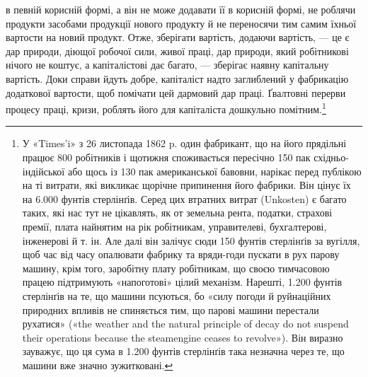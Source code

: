 в певній корисній формі, а він не може додавати її в корисній
формі, не роблячи продукти засобами продукції нового продукту
й не переносячи тим самим їхньої вартости на новий продукт.
Отже, зберігати вартість, додаючи вартість, — це є дар природи,
діющої робочої сили, живої праці, дар природи, який робітникові
нічого не коштує, а капіталістові дає багато, — зберігає наявну
капітальну вартість.  Доки справи йдуть добре, капіталіст
надто заглиблений у фабрикацію додаткової вартости, щоб помічати
цей дармовий дар праці. Ґвалтовні перерви процесу праці,
кризи, роблять його для капіталіста дошкульно помітним.\footnote{
У «Times’i» з 26 листопада 1862 p. один фабрикант, що на його
прядільні працює 800 робітників і щотижня споживається пересічно 150 пак
східньо-індійської або щось із 130 пак американської бавовни, нарікає
перед публікою на ті витрати, які викликає щорічне припинення його
фабрики. Він цінує їх на 6.000 фунтів стерлінґів. Серед цих втратних
витрат (Unkosten) є багато таких, які нас тут не цікавлять, як от земельна
рента, податки, страхові премії, плата найнятим на рік робітникам, управителеві,
бухгалтерові, інженерові й т. ін. Але далі він залічує сюди
150 фунтів стерлінґів за вугілля, щоб час від часу опалювати фабрику та
вряди-годи пускати в рух парову машину, крім того, заробітну плату
робітникам, що своєю тимчасовою працею підтримують «напоготові»
цілий механізм. Нарешті, 1.200 фунтів стерлінґів на те, що машини псуються,
бо «силу погоди й руйнаційних природних впливів не спиняється
тим, що парові машини перестали рухатися» («the weather and the natural
principle of decay do not suspend their operations because the steamengine
ceases to revolve»). Він виразно зауважує, що ця сума в 1.200 фунтів
стерлінґів така незначна через те, що машини вже значно зужитковані.
}

